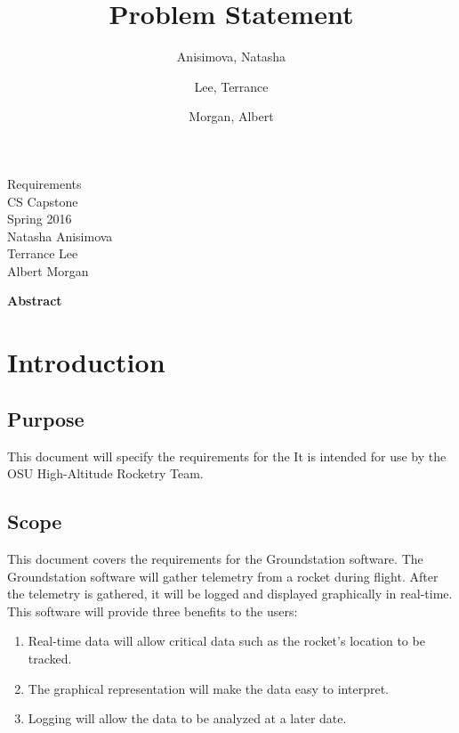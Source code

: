 \documentclass[10pt,journal,draftclsnofoot,onecolumn]{IEEEtran}
\begin{document}
	\singlespace
	
	\title{\vspace{2in}Problem Statement}
	
	\author {
		Anisimova, Natasha
		\and
		Lee, Terrance
		\and
		Morgan, Albert
	}
	
	
	\pagestyle{empty}
	\vspace*{2in}
	\begin{center}
		\huge
		Requirements\\
		\normalsize
		\vspace{5mm}
		CS Capstone\\
		Spring 2016\\
		\vspace{5mm}
		Natasha Anisimova\\
		Terrance Lee\\
		Albert Morgan
	\end{center}
	
	\vspace{5mm}
	
	\begin{center}
		\textbf{Abstract}
	\end{center}
	
	\begin{adjustwidth}{2in}{2in}
	
	
	\end{adjustwidth}
	
	\newpage
	\pagestyle{headings}


	\section{Introduction}
	
	\subsection{Purpose}
	This document will specify the requirements for the 
	It is intended for use by the OSU High-Altitude Rocketry Team.
	
	\subsection{Scope}
	This document covers the requirements for the Groundstation software.
	The Groundstation software will gather telemetry from a rocket during flight.
	After the telemetry is gathered, it will be logged and displayed graphically in real-time.
	This software will provide three benefits to the users:
	\begin{enumerate}
		\item Real-time data will allow critical data such as the rocket's location to be tracked.
		\item The graphical representation will make the data easy to interpret.
		\item Logging will allow the data to be analyzed at a later date.
	\end{enumerate}	
			
\end{document}
